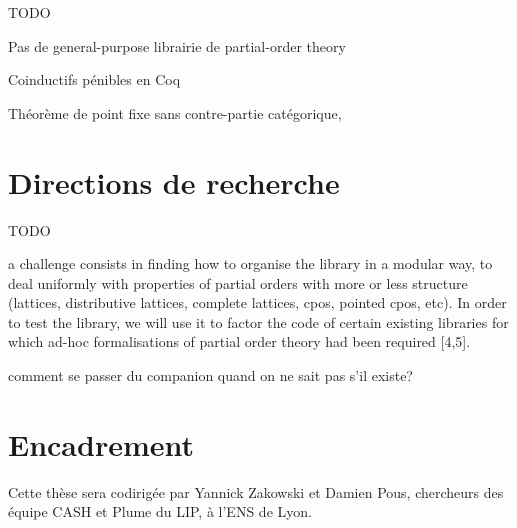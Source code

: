 \documentclass[a4paper,11pt]{article}
\begin{document}
TODO

Pas de general-purpose librairie de partial-order theory


Coinductifs pénibles en Coq

Théorème de point fixe sans contre-partie catégorique, 

\section{Directions de recherche}

TODO

a challenge consists in finding how to organise the library in a modular way, to deal uniformly with properties of partial orders with more or less structure (lattices, distributive lattices, complete lattices, cpos, pointed cpos, etc). In order to test the library, we will use it to factor the code of certain existing libraries for which ad-hoc formalisations of partial order theory had been required [4,5].

comment se passer du companion quand on ne sait pas s'il existe?

\section{Encadrement}

Cette thèse sera codirigée par Yannick Zakowski et Damien Pous, chercheurs des équipe CASH et Plume du LIP, à l'ENS de Lyon.



\end{document}
